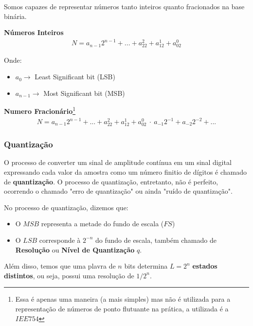 \documentclass{article}
\begin{document}
Somos capazes de representar números tanto inteiros quanto fracionados na base binária.

\textbf{Números Inteiros}
\begin{align*}
    N = a_{n-1}2^{n-1}+...+a_22^2 + a_12^1 + a_02^0
\end{align*}

Onde:
\begin{itemize}
    \item $a_0 \rightarrow$ Least Significant bit (LSB)
    \item $a_{n-1} \rightarrow$ Most Significant bit (MSB)
\end{itemize}

\textbf{Numero Fracionário}\footnote{Essa  é apenas uma maneira (a mais simples) mas não é utilizada para a representação de números de ponto flutuante na prática, a utilizada é a $IEE754$}
\begin{align*}
    N = a_{n-1}2^{n-1}+...+a_22^2 + a_12^1 + a_02^0\ \cdot \ a_{-1}2^{-1} + a_{-2}2^{-2}+...
\end{align*}

\subsubsection{Quantização}
O processo de converter um sinal de amplitude contínua em um sinal digital expressando cada valor da amostra como um número finitio de dígitos é chamado de \textbf{quantização}.
O processo de quantização, entretanto, não é perfeito, ocorrendo o chamado "erro de quantização" ou ainda "ruído de quantização".

No processo de quantização, dizemos que:
\begin{itemize}
    \item O $MSB$ representa a metade  do fundo de escala ($FS$)
    \item O $LSB$ corresponde à $2^{-n}$ do fundo de escala, também chamado de \textbf{Resolução} ou \textbf{Nível de Quantização} $q$.
\end{itemize}

Além disso, temos que uma plavra de $n$ bits determina $L = 2^n$ \textbf{estados distintos}, ou seja, possui uma resolução de $1/2^n$.
\end{document}
